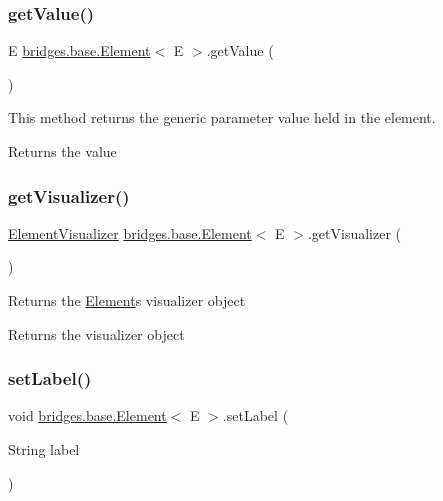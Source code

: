 \subsubsection{\texorpdfstring{get\+Value()}{getValue()}}
{\footnotesize\ttfamily E \hyperlink{classbridges_1_1base_1_1_element}{bridges.\+base.\+Element}$<$ E $>$.get\+Value (\begin{DoxyParamCaption}{ }\end{DoxyParamCaption})}

This method returns the generic parameter value held in the element.

\begin{DoxyReturn}{Returns}
the value 
\end{DoxyReturn}
\hypertarget{classbridges_1_1base_1_1_element_a42c84d41dfb7bd05a586e303cb33de72}{}\label{classbridges_1_1base_1_1_element_a42c84d41dfb7bd05a586e303cb33de72} 
\subsubsection{\texorpdfstring{get\+Visualizer()}{getVisualizer()}}
{\footnotesize\ttfamily \hyperlink{classbridges_1_1base_1_1_element_visualizer}{Element\+Visualizer} \hyperlink{classbridges_1_1base_1_1_element}{bridges.\+base.\+Element}$<$ E $>$.get\+Visualizer (\begin{DoxyParamCaption}{ }\end{DoxyParamCaption})}

Returns the \hyperlink{classbridges_1_1base_1_1_element}{Element}\textquotesingle{}s visualizer object

\begin{DoxyReturn}{Returns}
the visualizer object 
\end{DoxyReturn}
\hypertarget{classbridges_1_1base_1_1_element_a942ccd766aeca0c4fdbe27ef8cbe78d9}{}\label{classbridges_1_1base_1_1_element_a942ccd766aeca0c4fdbe27ef8cbe78d9} 
\subsubsection{\texorpdfstring{set\+Label()}{setLabel()}}
{\footnotesize\ttfamily void \hyperlink{classbridges_1_1base_1_1_element}{bridges.\+base.\+Element}$<$ E $>$.set\+Label (\begin{DoxyParamCaption}\item[{String}]{label }\end{DoxyParamCaption})}

